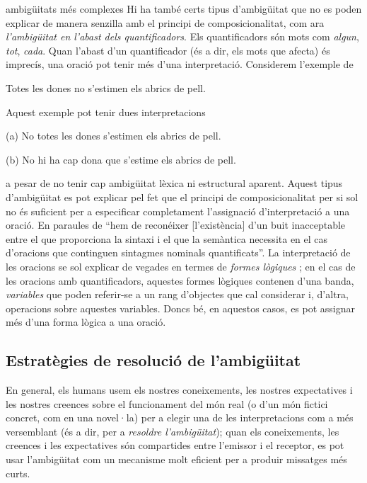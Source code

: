 \begin{persabermes}{ambigüitats més complexes}
  Hi ha també certs tipus d'ambigüitat que no es poden explicar de
  manera senzilla amb el principi de composicionalitat, com ara {\em
    l'ambigüitat en l'abast dels quantificadors}. Els quantificadors
  són mots com \emph{algun}, \emph{tot}, \emph{cada}.  Quan l'abast
  d'un quantificador (és a dir, els mots que afecta) és imprecís, una
  oració pot tenir més d'una interpretació. Considerem l'exemple de
  \cite{hutchins92b}
  \begin{exemple}
    Totes les dones no s'estimen els abrics de pell.
    \label{eq:abric}
  \end{exemple}
  Aquest exemple pot tenir dues interpretacions
  \begin{exemple}
  \item[(a)] No totes les dones s'estimen els abrics de pell.
  \item[(b)] No hi ha cap dona que s'estime els abrics de pell.
  \end{exemple}
  a pesar de no tenir cap ambigüitat lèxica ni estructural aparent.
  Aquest tipus d'ambigüitat es pot explicar pel fet que el principi de
  composicionalitat per si sol no és suficient per a especificar
  completament l'assignació d'interpretació a una oració. En paraules
  de \citet[p.~364]{radford99b} ``hem de reconéixer [l'existència]
  d'un buit inacceptable entre el que proporciona la sintaxi i el que
  la semàntica necessita en el cas d'oracions que continguen sintagmes
  nominals quantificats''. La interpretació de les oracions se sol
  explicar de vegades en termes de {\em formes lògiques}
  \citep[cap.~23]{radford09b}; en el cas de les oracions amb
  quantificadors, aquestes formes lògiques contenen d'una banda,
  \emph{variables} que poden referir-se a un rang d'objectes que cal
  considerar i, d'altra, operacions sobre aquestes variables.  Doncs
  bé, en aquestos casos, es pot assignar més d'una forma lògica a una
  oració.

\mbox{}

\end{persabermes}

\subsection{Estratègies de resolució de l'ambigüitat}
En general, els humans usem els nostres coneixements, les nostres
expectatives i les nostres creences sobre el funcionament del món real
(o d'un món fictici concret, com en una novel·la) per a elegir una de
les interpretacions com a més versemblant (és a dir, per a
\emph{resoldre l'ambigüitat}); quan els coneixements, les creences i
les expectatives són compartides entre l'emissor i el receptor, es pot
usar l'ambigüitat com un mecanisme molt eficient per a produir
missatges més curts.

